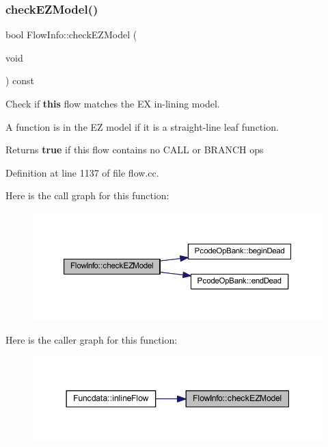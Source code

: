 \subsubsection{\texorpdfstring{checkEZModel()}{checkEZModel()}}
{\footnotesize\ttfamily bool Flow\+Info\+::check\+E\+Z\+Model (\begin{DoxyParamCaption}\item[{void}]{ }\end{DoxyParamCaption}) const}



Check if {\bfseries{this}} flow matches the EX in-\/lining model. 

A function is in the EZ model if it is a straight-\/line leaf function. \begin{DoxyReturn}{Returns}
{\bfseries{true}} if this flow contains no C\+A\+LL or B\+R\+A\+N\+CH ops 
\end{DoxyReturn}


Definition at line 1137 of file flow.\+cc.

Here is the call graph for this function\+:
\nopagebreak
\begin{figure}[H]
\begin{center}
\leavevmode
\includegraphics[width=350pt]{class_flow_info_a30fc4e81c062827b6e9f31c6ab6cd983_cgraph}
\end{center}
\end{figure}
Here is the caller graph for this function\+:
\nopagebreak
\begin{figure}[H]
\begin{center}
\leavevmode
\includegraphics[width=344pt]{class_flow_info_a30fc4e81c062827b6e9f31c6ab6cd983_icgraph}
\end{center}
\end{figure}
\mbox{\label{class_flow_info_a9484944b8fee15fc9a85ce26c4f878ae}} 
